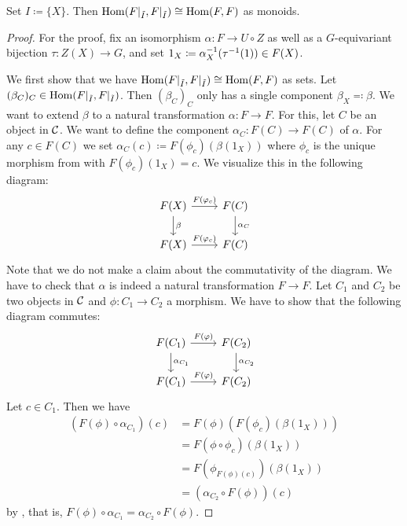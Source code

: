 \begin{prop}\label{prop:reduce_to_finite_I}
Set $I \coloneqq \{X\}$. Then $\operatorname{Hom}(F\vert_{\tilde I},F\vert_{\tilde I}) \cong \operatorname{Hom}(F,F)$ as monoids.
\end{prop}
\begin{proof}
For the proof, fix an isomorphism $\alpha\colon F \to U \circ Z$ as well as a $G$-equivariant bijection $\tau\colon Z(X) \to G$, and set $1_X \coloneqq \alpha_X^{-1}(\tau^{-1}(1)) \in F(X)$.

We first show that we have $\operatorname{Hom}(F\vert_{\tilde I},F\vert_{\tilde I}) \cong \operatorname{Hom}(F,F)$ as sets. Let $(\beta_C)_C \in \operatorname{Hom}(F\vert_{\tilde I},F\vert_{\tilde I})$. Then $(\beta_C)_C$ only has a single component $\beta_X \eqqcolon \beta$. We want to extend $\beta$ to a natural transformation $\alpha\colon F \to F$. For this, let $C$ be an object in $\mathcal{C}$. We want to define the component $\alpha_C\colon F(C) \to F(C)$ of $\alpha$. For any $c \in F(C)$ we set $\alpha_C(c) \coloneqq F(\phi_c)(\beta(1_X))$ where $\phi_c$ is the unique morphism from  with $F(\phi_c)(1_X) = c$. We visualize this in the following diagram:
\[
\begin{tikzcd}
F(X) \arrow[d, "\beta"] \arrow[r, "F(\phi_c)"] & F(C) \arrow[d, "\alpha_C"] \\
F(X) \arrow[r, "F(\phi_c)"]                    & F(C)                      
\end{tikzcd}
\]
Note that we do not make a claim about the commutativity of the diagram. We have to check that $\alpha$ is indeed a natural transformation $F \to F$. Let $C_1$ and $C_2$ be two objects in $\mathcal{C}$ and $\phi\colon C_1 \to C_2$ a morphism. We have to show that the following diagram commutes:
\[
\begin{tikzcd}
F(C_1) \arrow[d, "\alpha_{C_1}"] \arrow[r, "F(\phi)"] & F(C_2) \arrow[d, "\alpha_{C_2}"] \\
F(C_1) \arrow[r, "F(\phi)"]                           & F(C_2)                          
\end{tikzcd}
\]
Let $c \in C_1$. Then we have
\begin{align*}
(F(\phi) \circ \alpha_{C_1})(c) &= F(\phi)(F(\phi_c)(\beta(1_X)))\\
&= F(\phi \circ \phi_c)(\beta(1_X))\\
&= F(\phi_{F(\phi)(c)})(\beta(1_X))\\
&= (\alpha_{C_2} \circ F(\phi))(c)
\end{align*}
by , that is, $F(\phi) \circ \alpha_{C_1} = \alpha_{C_2} \circ F(\phi)$.


\end{proof}
